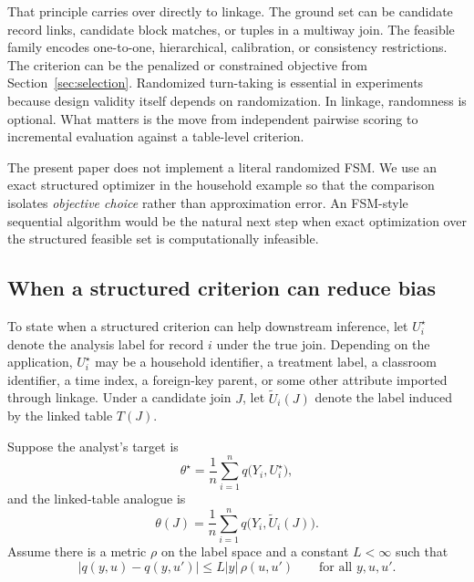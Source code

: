 \documentclass[11pt]{article}
\theoremstyle{remark}
\begin{document}
That principle carries over directly to linkage. The ground set can be candidate record links, candidate block matches, or tuples in a multiway join. The feasible family encodes one-to-one, hierarchical, calibration, or consistency restrictions. The criterion can be the penalized or constrained objective from Section~\ref{sec:selection}. Randomized turn-taking is essential in experiments because design validity itself depends on randomization. In linkage, randomness is optional. What matters is the move from independent pairwise scoring to incremental evaluation against a table-level criterion.

The present paper does not implement a literal randomized FSM. We use an exact structured optimizer in the household example so that the comparison isolates \emph{objective choice} rather than approximation error. An FSM-style sequential algorithm would be the natural next step when exact optimization over the structured feasible set is computationally infeasible.

\subsection{When a structured criterion can reduce bias}

To state when a structured criterion can help downstream inference, let $U_i^\star$ denote the analysis label for record $i$ under the true join. Depending on the application, $U_i^\star$ may be a household identifier, a treatment label, a classroom identifier, a time index, a foreign-key parent, or some other attribute imported through linkage. Under a candidate join $J$, let $\widetilde U_i(J)$ denote the label induced by the linked table $T(J)$.

Suppose the analyst's target is
\begin{equation}
\theta^\star=\frac{1}{n}\sum_{i=1}^n q\bigl(Y_i,U_i^\star\bigr),
\label{eq:target-general}
\end{equation}
and the linked-table analogue is
\begin{equation}
\theta(J)=\frac{1}{n}\sum_{i=1}^n q\bigl(Y_i,\widetilde U_i(J)\bigr).
\label{eq:linked-general}
\end{equation}
Assume there is a metric $\rho$ on the label space and a constant $L<\infty$ such that
\begin{equation}
\bigl|q(y,u)-q(y,u')\bigr|\le L|y|\,\rho(u,u')
\qquad\text{for all }y,u,u'.
\label{eq:lipschitz-q}
\end{equation}
\end{document}
